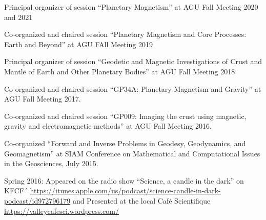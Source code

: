 \documentclass[10pt]{article}
\begin{document}
\spcp
Principal organizer of session ``Planetary Magnetism'' at AGU Fall Meeting 2020 and 2021

\spcp Co-organized and chaired session ``Planetary Magnetism
and Core Processes: Earth and Beyond'' at AGU FAll Meeting 2019

\spcp Principal organizer of session ``Geodetic and Magnetic
Investigations of Crust and Mantle of Earth and Other Planetary
Bodies'' at AGU Fall Meeting 2018

\spcp
Co-organized and chaired session
``GP34A: Planetary Magnetism and Gravity''
at AGU Fall Meeting 2017.
          
\spcp
Co-organized and chaired session
``GP009: Imaging the crust using magnetic, gravity and electromagnetic methods''
at AGU Fall Meeting 2016.

\spcp Co-organized ``Forward and Inverse Problems in Geodesy,
Geodynamics, and Geomagnetism'' at SIAM Conference on Mathematical and
Computational Issues in the Geosciences, July 2015.

\spcp
Spring 2016: Appeared on the radio show ``Science, a candle in the dark'' on KFCF´
\url{https://itunes.apple.com/us/podcast/science-candle-in-dark-podcast/id972796179} and Presented at the local Caf\'e Scientifique \url{https://valleycafesci.wordpress.com/}




%
\end{document}
